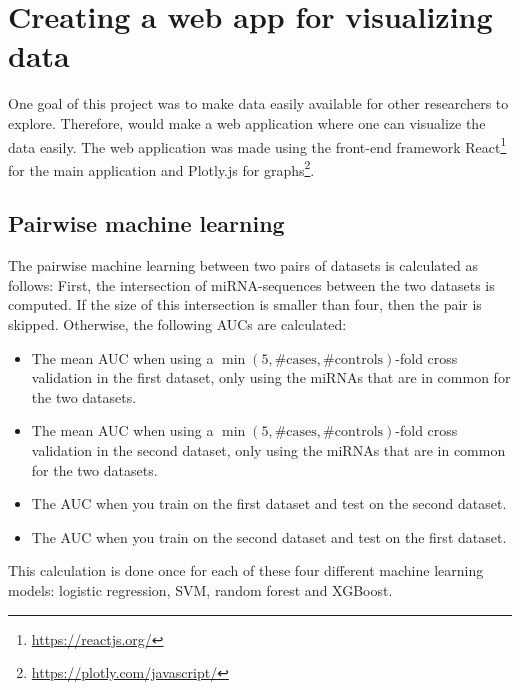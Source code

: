 \section{Creating a web app for visualizing data}

One goal of this project was to make data easily available for other researchers to explore. Therefore, would make a web application where one can visualize the data easily. The web application was made using the front-end framework React\footnote{\url{https://reactjs.org/}} for the main application and Plotly.js for graphs\footnote{\url{https://plotly.com/javascript/}}.

\subsection{Pairwise machine learning}
\label{subsec:pairwise_machine_learning_met}


The pairwise machine learning between two pairs of datasets is calculated as follows: First, the intersection of miRNA-sequences between the two datasets is computed. If the size of this intersection is smaller than four, then the pair is skipped. Otherwise, the following AUCs are calculated:

\begin{itemize}
    \item The mean AUC when using a $\min(5, \text{\#cases}, \text{\#controls})$-fold cross validation in the first dataset, only using the miRNAs that are in common for the two datasets.
    \item The mean AUC when using a $\min(5, \text{\#cases}, \text{\#controls})$-fold cross validation in the second dataset, only using the miRNAs that are in common for the two datasets.
    \item The AUC when you train on the first dataset and test on the second dataset.
    \item The AUC when you train on the second dataset and test on the first dataset.
\end{itemize}

This calculation is done once for each of these four different machine learning models: logistic regression, SVM, random forest and XGBoost.


\iffalse
Here you will present the architecture or model that you have chosen and that is (or will be) implemented in your work. Note that putting algorithms in your report is not desirable but in certain cases these might be placed in the appendix. Code further be avoided in the report itself but may be delivered in the fashion requested by the supervisor or, in the case of masters delivery, submitted as additional documents. 
\fi
